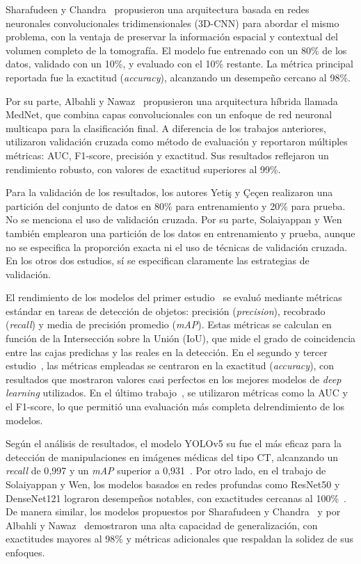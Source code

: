 \documentclass[conference]{IEEEtran}
\begin{document}
Sharafudeen y Chandra~\cite{sharafudeen2022} propusieron una arquitectura basada en redes neuronales convolucionales tridimensionales (3D-CNN) para abordar el mismo problema, con la ventaja de preservar la información espacial y contextual del volumen completo de la tomografía. El modelo fue entrenado con un 80\% de los datos, validado con un 10\%, y evaluado con el 10\% restante. La métrica principal reportada fue la exactitud (\textit{accuracy}), alcanzando un desempeño cercano al 98\%.

Por su parte, Albahli y Nawaz~\cite{albahli2023} propusieron una arquitectura híbrida llamada MedNet, que combina capas convolucionales con un enfoque de red neuronal multicapa para la clasificación final. A diferencia de los trabajos anteriores, utilizaron validación cruzada como método de evaluación y reportaron múltiples métricas: AUC, F1-score, precisión y exactitud. Sus resultados reflejaron un rendimiento robusto, con valores de exactitud superiores al 99\%.

Para la validación de los resultados, los autores Yetiş y Çeçen realizaron una partición del conjunto de datos en 80\% para entrenamiento y 20\% para prueba. No se menciona el uso de validación cruzada. Por su parte, Solaiyappan y Wen también emplearon una partición de los datos en entrenamiento y prueba, aunque no se especifica la proporción exacta ni el uso de técnicas de validación cruzada. En los otros dos estudios, sí se especifican claramente las estrategias de validación.

El rendimiento de los modelos del primer estudio~\cite{yetis2024} se evaluó mediante métricas estándar en tareas de detección de objetos: precisión (\textit{precision}), recobrado (\textit{recall}) y media de precisión promedio (\textit{mAP}). Estas métricas se calculan en función de la Intersección sobre la Unión (IoU), que mide el grado de coincidencia entre las cajas predichas y las reales en la detección. En el segundo y tercer estudio~\cite{solaiyappan2022, sharafudeen2022}, las métricas empleadas se centraron en la exactitud (\textit{accuracy}), con resultados que mostraron valores casi perfectos en los mejores modelos de \textit{deep learning} utilizados. En el último trabajo~\cite{albahli2023}, se utilizaron métricas como la AUC y el F1-score, lo que permitió una evaluación más completa delrendimiento de los modelos.

Según el análisis de resultados, el modelo YOLOv5 su fue el más eficaz para la detección de manipulaciones en imágenes médicas del tipo CT, alcanzando un \textit{recall} de 0{,}997 y un \textit{mAP} superior a 0{,}931~\cite{yetis2024}. Por otro lado, en el trabajo de Solaiyappan y Wen, los modelos basados en redes profundas como ResNet50 y DenseNet121 lograron desempeños notables, con exactitudes cercanas al 100\%~\cite{solaiyappan2022}. De manera similar, los modelos propuestos por Sharafudeen y Chandra~\cite{sharafudeen2022} y por Albahli y Nawaz~\cite{albahli2023} demostraron una alta capacidad de generalización, con exactitudes mayores al 98\% y métricas adicionales que respaldan la solidez de sus enfoques.
\end{document}
